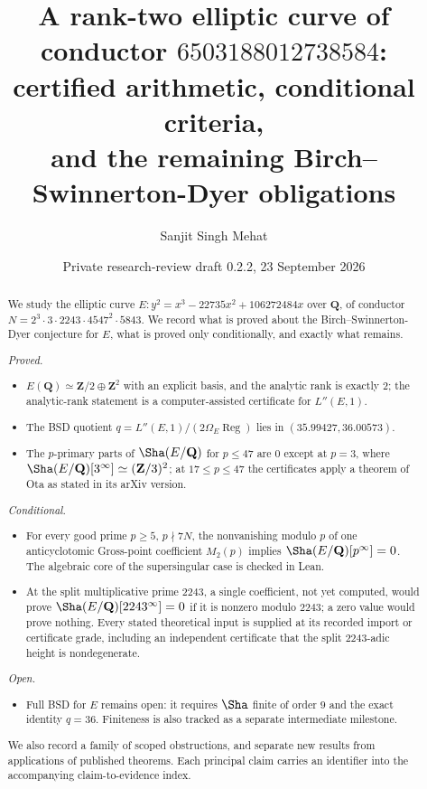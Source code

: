 \documentclass[11pt]{amsart}
\title[A rank-two elliptic curve: certified arithmetic and remaining BSD obligations]{A rank-two elliptic curve of conductor $6503188012738584$:\\ certified arithmetic, conditional criteria,\\ and the remaining Birch--Swinnerton-Dyer obligations}
\author{Sanjit Singh Mehat}
\date{Private research-review draft 0.2.2, 23 September 2026}
\newcommand{\Q}{\mathbf{Q}}
\newcommand{\Z}{\mathbf{Z}}
\newcommand{\Reg}{\operatorname{Reg}}
\theoremstyle{plain}
\theoremstyle{definition}
\theoremstyle{remark}
\begin{document}
\begin{abstract}
We study the elliptic curve $E\colon y^2=x^3-22735x^2+106272484x$ over $\Q$, of conductor $N=2^3\cdot3\cdot2243\cdot4547^2\cdot5843$. We record what is proved about the Birch--Swinnerton-Dyer conjecture for $E$, what is proved only conditionally, and exactly what remains.

\emph{Proved.}
\begin{itemize}[leftmargin=*]
\item $E(\Q)\simeq\Z/2\oplus\Z^2$ with an explicit basis, and the analytic rank is exactly $2$; the analytic-rank statement is a computer-assisted certificate for $L''(E,1)$.
\item The BSD quotient $q=L''(E,1)/(2\Omega_E\Reg)$ lies in $(35.99427,36.00573)$.
\item The $p$-primary parts of $\Sha(E/\Q)$ for $p\le47$ are $0$ except at $p=3$, where $\Sha(E/\Q)[3^\infty]\simeq(\Z/3)^2$; at $17\le p\le47$ the certificates apply a theorem of Ota as stated in its arXiv version.
\end{itemize}

\emph{Conditional.}
\begin{itemize}[leftmargin=*]
\item For every good prime $p\ge5$, $p\nmid7N$, the nonvanishing modulo $p$ of one anticyclotomic Gross-point coefficient $M_2(p)$ implies $\Sha(E/\Q)[p^\infty]=0$. The algebraic core of the supersingular case is checked in Lean.
\item At the split multiplicative prime $2243$, a single coefficient, not yet computed, would prove $\Sha(E/\Q)[2243^\infty]=0$ if it is nonzero modulo $2243$; a zero value would prove nothing. Every stated theoretical input is supplied at its recorded import or certificate grade, including an independent certificate that the split $2243$-adic height is nondegenerate.
\end{itemize}

\emph{Open.}
\begin{itemize}[leftmargin=*]
\item Full BSD for $E$ remains open: it requires $\Sha$ finite of order $9$ and the exact identity $q=36$. Finiteness is also tracked as a separate intermediate milestone.
\end{itemize}

We also record a family of scoped obstructions, and separate new results from applications of published theorems. Each principal claim carries an identifier into the accompanying claim-to-evidence index.
\end{abstract}
\end{document}

